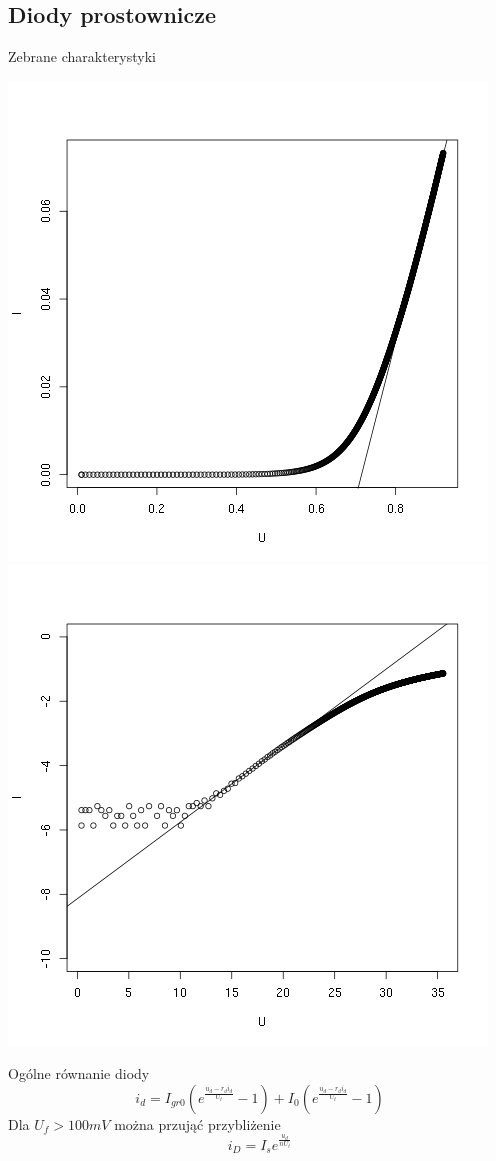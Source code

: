 \documentclass[11pt]{article}
\begin{document}
\subsection{Diody prostownicze}
Zebrane charakterystyki
\begin{center}
\includegraphics[scale=0.45]{out/prostownicza-normal.png}
\includegraphics[scale=0.45]{out/prostownicza-log.png}
\end{center}
Ogólne równanie diody
$$ i_d = I_{gr0}(e^{\frac{u_d - r_di_d}{U_t}} - 1) + I_0(e^{\frac{u_d - r_di_d}{U_t}} -1) $$
Dla $ U_f > 100mV$ można przująć przybliżenie
$$ i_D = I_se^\frac{u_d}{nU_t} $$
\end{document}
